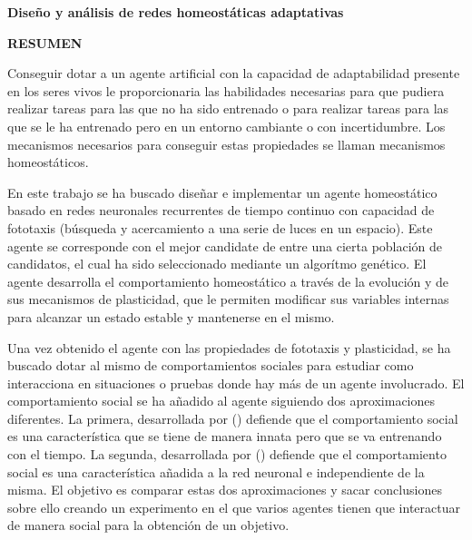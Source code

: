 \begin{center}
{\Large \bfseries Diseño y análisis de redes homeostáticas adaptativas}

\vspace{1cm}
{\Large \bfseries RESUMEN}

\vspace{2.5cm}
\end{center}

Conseguir dotar a un agente artificial con la capacidad de adaptabilidad presente en los seres vivos le proporcionaria las habilidades necesarias para que pudiera realizar tareas para las que no ha sido entrenado o
para realizar tareas para las que se le ha entrenado pero en un entorno cambiante o con incertidumbre. Los mecanismos necesarios para conseguir estas propiedades se llaman mecanismos homeostáticos.

En este trabajo se ha buscado diseñar e implementar un agente homeostático basado en redes neuronales recurrentes de tiempo continuo con capacidad de fototaxis (búsqueda y acercamiento a una serie de luces en un espacio).
Este agente se corresponde con el mejor candidate de entre una cierta población de candidatos, el cual ha sido seleccionado mediante un algorítmo genético. El agente desarrolla el comportamiento homeostático a través de
la evolución y de sus mecanismos de plasticidad, que le permiten modificar sus variables internas para alcanzar un estado estable y mantenerse en el mismo.

Una vez obtenido el agente con las propiedades de fototaxis y plasticidad, se ha buscado dotar al mismo de comportamientos sociales para estudiar como interacciona en situaciones o pruebas donde hay más de un agente
involucrado. El comportamiento social se ha añadido al agente siguiendo dos aproximaciones diferentes. La primera, desarrollada por () defiende que el comportamiento social es una característica que se tiene de manera
innata pero que se va entrenando con el tiempo. La segunda, desarrollada por () defiende que el comportamiento social es una característica añadida a la red neuronal e independiente de la misma. El objetivo es comparar
estas dos aproximaciones y sacar conclusiones sobre ello creando un experimento en el que varios agentes tienen que interactuar de manera social para la obtención de un objetivo.
